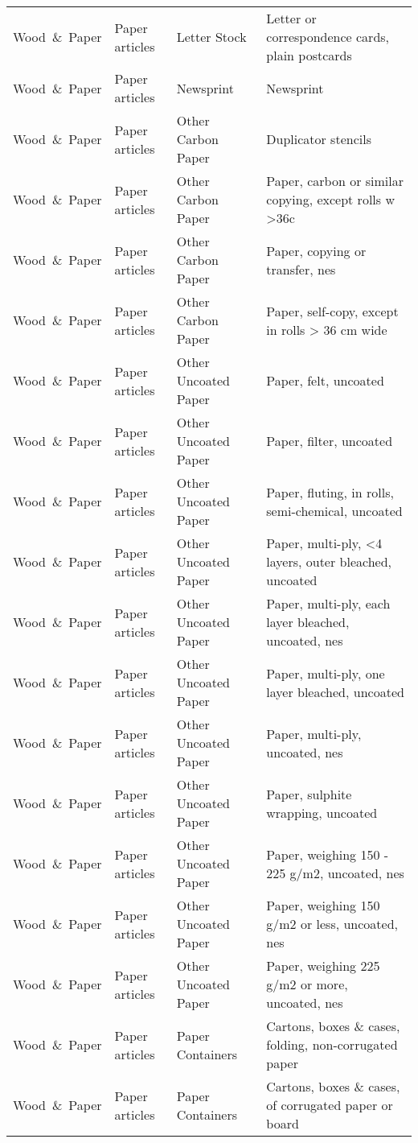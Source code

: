 \begin{appendices}
\begin{xltabular}{\textwidth}{|p{0.10\textwidth}|p{0.25\textwidth}|p{0.20\textwidth}|p{0.35\textwidth}|}
			Wood\ \&\ Paper & Paper articles & Letter Stock & Letter or correspondence cards, plain postcards \\
			Wood\ \&\ Paper & Paper articles & Newsprint & Newsprint \\
			Wood\ \&\ Paper & Paper articles & Other Carbon Paper & Duplicator stencils \\
			Wood\ \&\ Paper & Paper articles & Other Carbon Paper & Paper, carbon or similar copying, except rolls w >36c \\
			Wood\ \&\ Paper & Paper articles & Other Carbon Paper & Paper, copying or transfer, nes \\
			Wood\ \&\ Paper & Paper articles & Other Carbon Paper & Paper, self-copy, except in rolls > 36 cm wide \\
			Wood\ \&\ Paper & Paper articles & Other Uncoated Paper & Paper, felt, uncoated \\
			Wood\ \&\ Paper & Paper articles & Other Uncoated Paper & Paper, filter, uncoated \\
			Wood\ \&\ Paper & Paper articles & Other Uncoated Paper & Paper, fluting, in rolls, semi-chemical, uncoated \\
			Wood\ \&\ Paper & Paper articles & Other Uncoated Paper & Paper, multi-ply, <4 layers, outer bleached, uncoated \\
			Wood\ \&\ Paper & Paper articles & Other Uncoated Paper & Paper, multi-ply, each layer bleached, uncoated, nes \\
			Wood\ \&\ Paper & Paper articles & Other Uncoated Paper & Paper, multi-ply, one layer bleached, uncoated \\
			Wood\ \&\ Paper & Paper articles & Other Uncoated Paper & Paper, multi-ply, uncoated, nes \\
			Wood\ \&\ Paper & Paper articles & Other Uncoated Paper & Paper, sulphite wrapping, uncoated \\
			Wood\ \&\ Paper & Paper articles & Other Uncoated Paper & Paper, weighing 150 - 225 g/m2, uncoated, nes \\
			Wood\ \&\ Paper & Paper articles & Other Uncoated Paper & Paper, weighing 150 g/m2 or less, uncoated, nes \\
			Wood\ \&\ Paper & Paper articles & Other Uncoated Paper & Paper, weighing 225 g/m2 or more, uncoated, nes \\
			Wood\ \&\ Paper & Paper articles & Paper Containers & Cartons, boxes \& cases, folding, non-corrugated paper \\
			Wood\ \&\ Paper & Paper articles & Paper Containers & Cartons, boxes \& cases, of corrugated paper or board \\

\end{xltabular}
\end{appendices}
